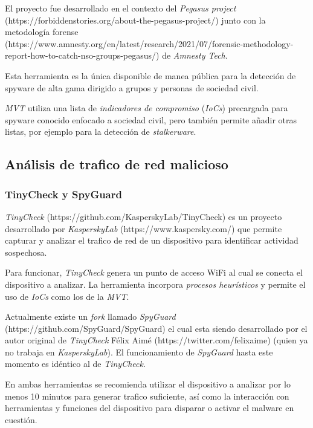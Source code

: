 \documentclass[12pt]{caltech_thesis}
\begin{document}
El proyecto fue desarrollado en el contexto del \textit{Pegasus project} (https://forbiddenstories.org/about-the-pegasus-project/) junto con la metodología forense (https://www.amnesty.org/en/latest/research/2021/07/forensic-methodology-report-how-to-catch-nso-groups-pegasus/) de \textit{Amnesty Tech}.

Esta herramienta es la única disponible de manea pública para la detección de spyware de alta gama dirigido a grupos y personas de sociedad civil.

\textit{MVT} utiliza una lista de \textit{indicadores de compromiso} (\textit{IoCs}) precargada para spyware conocido enfocado a sociedad civil, pero también permite añadir otras listas, por ejemplo para la detección de \textit{stalkerware}.

\subsection{Análisis de trafico de red malicioso}

\subsubsection{TinyCheck y SpyGuard}

\textit{TinyCheck} (https://github.com/KasperskyLab/TinyCheck) es un proyecto desarrollado por \textit{KasperskyLab} (https://www.kaspersky.com/) que permite capturar y analizar el trafico de red de un dispositivo para identificar actividad sospechosa.

Para funcionar, \textit{TinyCheck} genera un punto de acceso WiFi al cual se conecta el dispositivo a analizar. La herramienta incorpora \textit{procesos heurísticos} y permite el uso de \textit{IoCs} como los de la \textit{MVT}.

Actualmente existe un \textit{fork} llamado \textit{SpyGuard} (https://github.com/SpyGuard/SpyGuard) el cual esta siendo desarrollado por el autor original de \textit{TinyCheck} Félix Aimé (https://twitter.com/felixaime) (quien ya no trabaja en \textit{KasperskyLab}). El funcionamiento de \textit{SpyGuard} hasta este momento es idéntico al de \textit{TinyCheck}.

En ambas herramientas se recomienda utilizar el dispositivo a analizar por lo menos 10 minutos para generar trafico suficiente, así como la interacción con herramientas y funciones del dispositivo para disparar o activar el malware en cuestión.
\end{document}
